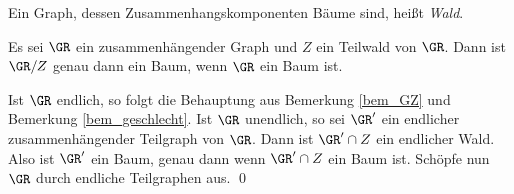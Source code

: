 \DEF Ein Graph, dessen Zusammenhangskomponenten Bäume sind,
heißt \emph{Wald}.

\PROP\label{prop_wald}
Es sei $\GR$ ein zusammenhängender Graph und $Z$ ein Teilwald
von $\GR$. Dann ist $\GR/Z$ genau dann ein Baum, wenn $\GR$ ein
Baum ist.

\bew Ist $\GR$ endlich, so folgt die Behauptung aus Bemerkung
\ref{bem_GZ} und Bemerkung \ref{bem_geschlecht}.
Ist $\GR$ unendlich, so sei $\GR'$ ein endlicher zusammenhängender
Teilgraph von $\GR$. Dann ist $\GR'\cap Z$ ein endlicher Wald.
Also ist $\GR'$ ein Baum, genau dann wenn $\GR'\cap Z$ ein Baum
ist. Schöpfe nun $\GR$ durch endliche Teilgraphen aus.
\qed

